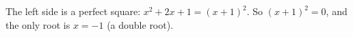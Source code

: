The left side is a perfect square: $x^2+2x+1=(x+1)^2$. So $(x+1)^2=0$, and the only root is $\boxed{x=-1}$ (a double root).
